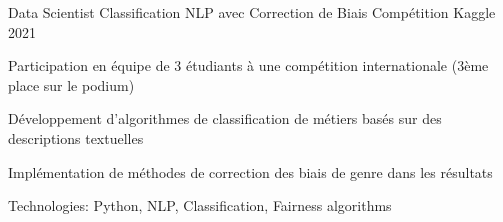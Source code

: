 \begin{cventries}
\cventry
{Data Scientist} %
{Classification NLP avec Correction de Biais} %
{Compétition Kaggle} %
{2021} %
{ %
\begin{cvitems}
\item {Participation en équipe de 3 étudiants à une compétition internationale (3ème place sur le podium)}
\item {Développement d'algorithmes de classification de métiers basés sur des descriptions textuelles}
\item {Implémentation de méthodes de correction des biais de genre dans les résultats}
\item {Technologies: Python, NLP, Classification, Fairness algorithms}
\end{cvitems}
}


\end{cventries}